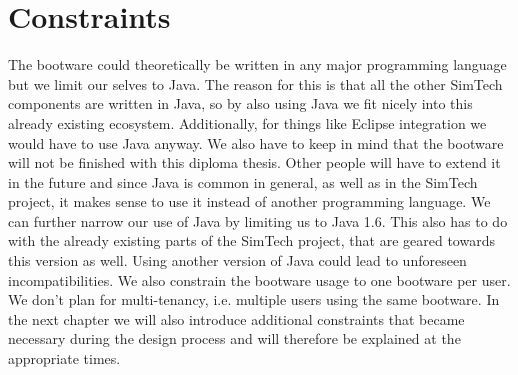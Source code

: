 \section{Constraints}

The bootware could theoretically be written in any major programming language but we limit our selves to Java.
The reason for this is that all the other SimTech components are written in Java, so by also using Java we fit nicely into this already existing ecosystem.
Additionally, for things like Eclipse integration we would have to use Java anyway.
We also have to keep in mind that the bootware will not be finished with this diploma thesis.
Other people will have to extend it in the future and since Java is common in general, as well as in the SimTech project, it makes sense to use it instead of another programming language.
We can further narrow our use of Java by limiting us to Java 1.6.
This also has to do with the already existing parts of the SimTech project, that are geared towards this version as well.
Using another version of Java could lead to unforeseen incompatibilities.
We also constrain the bootware usage to one bootware per user.
We don't plan for multi-tenancy, i.e. multiple users using the same bootware.
In the next chapter we will also introduce additional constraints that became necessary during the design process and will therefore be explained at the appropriate times.

